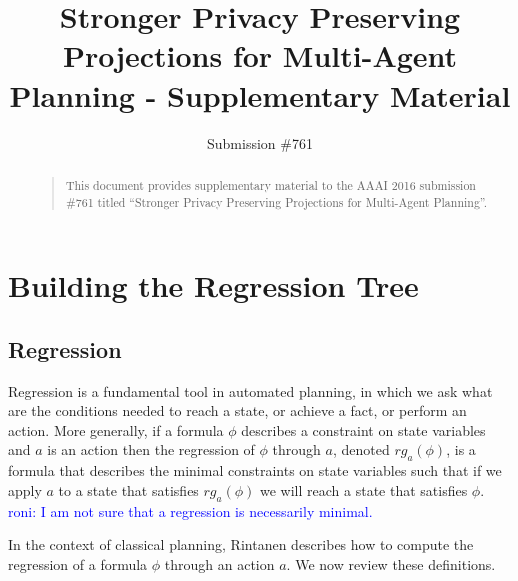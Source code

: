 \documentclass[letterpaper]{article}
\newcommand\roni[1]{\textcolor{blue}{roni: #1}}
\theoremstyle{definition}
\begin{document}
%
\title{Stronger Privacy Preserving Projections for Multi-Agent Planning - Supplementary Material}
\author{Submission \#761}
\maketitle
\begin{abstract}
\begin{quote}
This document provides supplementary material to the AAAI 2016 submission \#761 titled ``Stronger Privacy Preserving Projections for Multi-Agent Planning''. 
\end{quote}
\end{abstract}


\section{Building the Regression Tree}
\subsection{Regression}

Regression is a fundamental tool in automated planning, in which we ask what are the conditions needed to reach a state, or achieve a fact, or perform an action. More generally, if a formula $\phi$ describes a constraint on state variables and $a$ is an action then the regression of $\phi$ through $a$, denoted $rg_a(\phi)$, is a formula that describes the minimal constraints on state variables such that if we apply $a$ to a state that satisfies $rg_a(\phi)$ we will reach a state  that satisfies $\phi$. 
\roni{I am not sure that a regression is necessarily minimal. }

In the context of classical planning, Rintanen \cite{Rintanen} describes how to compute the regression of a formula $\phi$ through an action $a$. We now review these definitions. 
\end{document}
